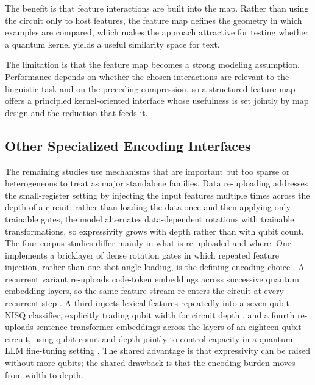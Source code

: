 \documentclass{ieeeaccess}
\begin{document}
The benefit is that feature interactions are built into the map. Rather than using the circuit only to host features, the feature map defines the geometry in which examples are compared, which makes the approach attractive for testing whether a quantum kernel yields a useful similarity space for text.

The limitation is that the feature map becomes a strong modeling assumption. Performance depends on whether the chosen interactions are relevant to the linguistic task and on the preceding compression, so a structured feature map offers a principled kernel-oriented interface whose usefulness is set jointly by map design and the reduction that feeds it.

\subsection{Other Specialized Encoding Interfaces}
\label{subsec:other_encoding_interfaces}

The remaining studies use mechanisms that are important but too sparse or heterogeneous to treat as major standalone families. Data re-uploading addresses the small-register setting by injecting the input features multiple times across the depth of a circuit: rather than loading the data once and then applying only trainable gates, the model alternates data-dependent rotations with trainable transformations, so expressivity grows with depth rather than with qubit count. The four corpus studies differ mainly in what is re-uploaded and where. One implements a bricklayer of dense rotation gates in which repeated feature injection, rather than one-shot angle loading, is the defining encoding choice \cite{hamilton_characterizing_2023}. A recurrent variant re-uploads code-token embeddings across successive quantum embedding layers, so the same feature stream re-enters the circuit at every recurrent step \cite{song_recurrent_2024}. A third injects lexical features repeatedly into a seven-qubit NISQ classifier, explicitly trading qubit width for circuit depth \cite{silver_lexiql_2024}, and a fourth re-uploads sentence-transformer embeddings across the layers of an eighteen-qubit circuit, using qubit count and depth jointly to control capacity in a quantum LLM fine-tuning setting \cite{kim_quantum_2025}. The shared advantage is that expressivity can be raised without more qubits; the shared drawback is that the encoding burden moves from width to depth.
\end{document}
